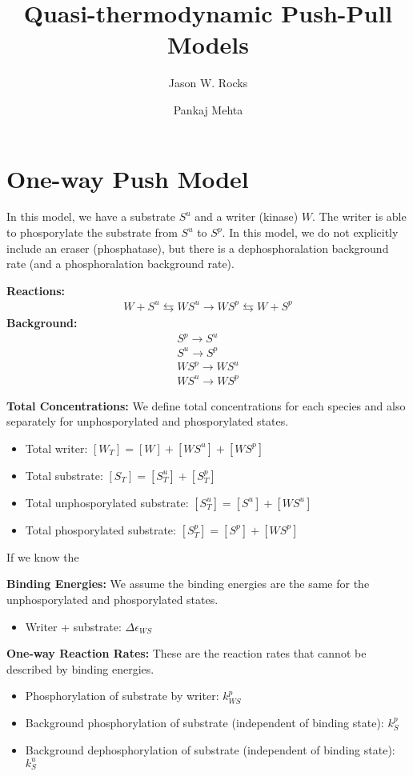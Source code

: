 \documentclass[aps,onecolumn,superscriptaddress,notitlepage]{revtex4-1}
\begin{document}
\title{Quasi-thermodynamic Push-Pull Models}
\author{Jason W. Rocks}
\author{Pankaj Mehta}
\maketitle


\section{One-way Push Model}


In this model, we have a substrate $S^u$ and a writer (kinase) $W$. 
The writer is able to phosporylate the substrate from $S^u$ to $S^p$.
In this model, we do not explicitly include an eraser (phosphatase), 
but there is a dephosphoralation background rate (and a phosphoralation background rate).

\textbf{Reactions:}
\begin{gather}
W + S^u \leftrightarrows WS^u \rightarrow WS^p \leftrightarrows W + S^p
\end{gather}
\textbf{Background:}
\begin{gather}
S^p \rightarrow S^u\\
S^u \rightarrow S^p\\
WS^p \rightarrow WS^u\\
WS^u \rightarrow WS^p
\end{gather}


\textbf{Total Concentrations:}
We define total concentrations for each species and also separately for unphosporylated and phosporylated states.
\begin{itemize}
\item Total writer: $[W_T] = [W] + [WS^u] + [WS^p]$
\item Total substrate: $[S_T] = [S^u_T] + [S^p_T]$
\item Total unphosporylated substrate: $[S^u_T] = [S^u] + [WS^u]$
\item Total phosporylated substrate: $[S^p_T] = [S^p] + [WS^p]$
\end{itemize}
If we know the 

\textbf{Binding Energies:}
We assume the binding energies are the same for the unphosporylated and phosporylated states.
\begin{itemize}
\item Writer + substrate: $\Delta\epsilon_{WS}$
\end{itemize}

\textbf{One-way Reaction Rates:}
These are the reaction rates that cannot be described by binding energies.
\begin{itemize}
\item Phosphorylation of substrate by writer: $k_{WS}^p$
\item Background phosphorylation of substrate (independent of binding state): $k_S^p$
\item Background dephosphorylation of substrate (independent of binding state): $k_S^u$
\end{itemize}
\end{document}
